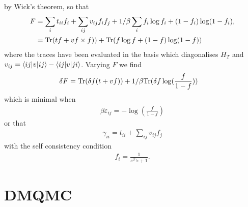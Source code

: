 \documentclass[11pt,twosided]{article}
\begin{document}
by Wick's theorem, so that
\begin{align}
F &= \sum_i t_{ii} f_i + \sum_{ij} v_{ij} f_i f_j + 1/\beta \sum_i f_i \log f_i + (1-f_i) \log (1-f_i),\\
  &= \mathrm{Tr}(tf + v f\times f)) + \mathrm{Tr}(f \log f + (1-f) \log (1-f))
\end{align}
where the traces have been evaluated in the basis which diagonalises $H_T$ and $v_{ij} = \langle ij| v |ij\rangle - \langle ij| v |ji\rangle$.
Varying $F$ we find
\begin{align}
\delta F &= \mathrm{Tr}(\delta f (t + v f)) + 1/\beta \mathrm{Tr}(\delta f \log (\frac{f}{1-f}))
\end{align}
which is minimal when
\begin{align}
\beta \varepsilon_{ij} = - \log (\frac{f}{1-f})
\end{align}
or that
\begin{align}
\gamma_{ii} = t_{ii} + \sum_{ij} v_{ij} f_j
\end{align}
with the self consistency condition
\begin{align}
f_i = \frac{1}{e^{\beta \gamma_{ii}} + 1}.
\end{align}
\section{DMQMC}
\end{document}
